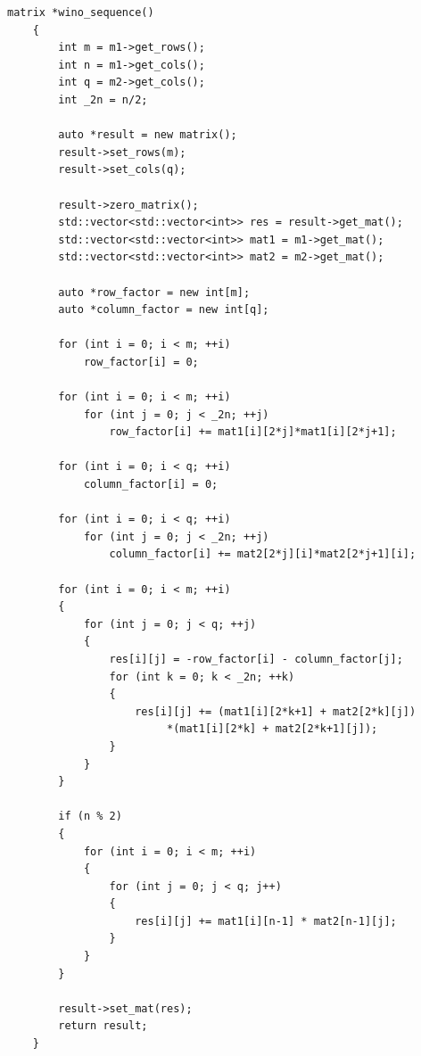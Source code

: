 \documentclass[a4paper,12pt]{report}
\begin{document}
        	\begin{lstlisting}[frame = single, breaklines, caption = Последовательный алгоритм Винограда, label=list:seq_wino]
	matrix *wino_sequence()
	{
		int m = m1->get_rows();
		int n = m1->get_cols();
		int q = m2->get_cols();
		int _2n = n/2;
				
		auto *result = new matrix();
		result->set_rows(m);
		result->set_cols(q);
				
		result->zero_matrix();
		std::vector<std::vector<int>> res = result->get_mat();
		std::vector<std::vector<int>> mat1 = m1->get_mat();
		std::vector<std::vector<int>> mat2 = m2->get_mat();
				
		auto *row_factor = new int[m];
		auto *column_factor = new int[q];
				
		for (int i = 0; i < m; ++i)
			row_factor[i] = 0;
				
		for (int i = 0; i < m; ++i)
			for (int j = 0; j < _2n; ++j)
				row_factor[i] += mat1[i][2*j]*mat1[i][2*j+1];
				
		for (int i = 0; i < q; ++i)
			column_factor[i] = 0;
			
		for (int i = 0; i < q; ++i)
			for (int j = 0; j < _2n; ++j)
				column_factor[i] += mat2[2*j][i]*mat2[2*j+1][i];
				
		for (int i = 0; i < m; ++i)
		{
			for (int j = 0; j < q; ++j)
			{
				res[i][j] = -row_factor[i] - column_factor[j];
				for (int k = 0; k < _2n; ++k)
				{
					res[i][j] += (mat1[i][2*k+1] + mat2[2*k][j])
						 *(mat1[i][2*k] + mat2[2*k+1][j]);
				}
			}
		}
				
		if (n % 2)
		{
			for (int i = 0; i < m; ++i)
			{
				for (int j = 0; j < q; j++)
				{
					res[i][j] += mat1[i][n-1] * mat2[n-1][j];
				}
			}
		}
			
		result->set_mat(res);
		return result;
	}
        	\end{lstlisting}
        	
\end{document}
